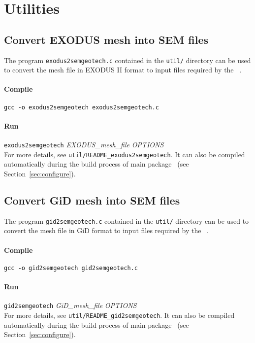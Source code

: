 \chapter{Utilities}
\label{chap:util}
\section{Convert EXODUS mesh into SEM files}

The program \texttt{exodus2semgeotech.c} contained in the \texttt{util/} directory can be used to convert the mesh file in EXODUS II format to input files required by the \pack\ .

\subsubsection*{Compile}
\texttt{gcc -o exodus2semgeotech exodus2semgeotech.c}
\subsubsection*{Run}
 \texttt{exodus2semgeotech} {\emph{EXODUS\_mesh\_file}} {\emph{OPTIONS}}\\
 For more details, see \texttt{util/README\_exodus2semgeotech}. It can also be compiled automatically during the build process of main package \pack\ (see Section~\ref{sec:configure}).

\section{Convert GiD mesh into SEM files}

The program \texttt{gid2semgeotech.c} contained in the \texttt{util/} directory can be used to convert the mesh file in GiD format to input files required by the \pack\ .

\subsubsection*{Compile}
\texttt{gcc -o gid2semgeotech gid2semgeotech.c}
\subsubsection*{Run}
 \texttt{gid2semgeotech} {\emph{GiD\_mesh\_file}} {\emph{OPTIONS}}\\
 For more details, see \texttt{util/README\_gid2semgeotech}. It can also be compiled automatically during the build process of main package \pack\ (see Section~\ref{sec:configure}).

